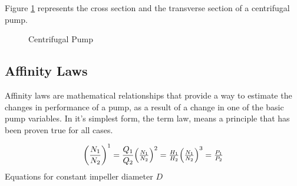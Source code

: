 Figure \ref{fig:pump_sections} represents the cross section and the transverse section of a centrifugal pump.
\newpage
\begin{figure}[h]
    \centering
    \qquad
    \hfill
    \caption{Centrifugal Pump}
    \label{fig:pump_sections}
\end{figure}

\subsection{Affinity Laws}
Affinity laws are mathematical relationships that provide a way to estimate the changes in performance of a pump, as a result
of a change in one of the basic pump variables.
In it's simplest form, the term law, means a principle that has been proven true for all cases.

\begin{equation}
	\left(\frac{N_1}{N_2}\right)^1 = \frac{Q_1}{Q_2}$$
	
	$$\left(\frac{N_1}{N_2}\right)^2 = \frac{H_1}{H_2}$$
	
	$$\left(\frac{N_1}{N_2}\right)^3 = \frac{P_1}{P_2}	
\end{equation} Equations for constant impeller diameter $D$ \cite{AffinityLaws}

